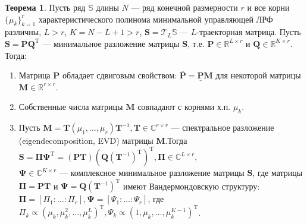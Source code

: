 \documentclass[specialist, substylefile = spbureport.rtx, subf,href,colorlinks=true, 12pt]{disser}
\theoremstyle{definition}
\newtheorem{theorem}{Теорема}
\DeclareMathOperator{\diag}{diag}
\begin{document}
\begin{theorem}
Пусть ряд $\mathbb{S}$ длины $N$ — ряд конечной размерности $r$ и все
корни $\{ \mu_k\}_{k=1}^r$ характеристического полинома минимальной управляющей ЛРФ различны, $L > r$, $K = N - L + 1 > r$, $\mathbf{S} = \mathcal{T}_L\mathbb{S}$ — $L$-траекторная матрица. Пусть $\mathbf{S} = \mathbf{PQ}^{\mathrm{T}}$ — минимальное разложение матрицы $\mathbf{S}$, т.е. $\mathbf{P} \in \mathbb{R}^{L \times r}$ и $\mathbf{Q} \in \mathbb{R}^{K \times r}$. \\
    \hspace*{0.5cm} Тогда:
    \begin{enumerate}
        \item Матрица $\mathbf{P}$ обладает сдвиговым свойством: $\overline{\mathbf{P}} = \underline{\mathbf{P}}\mathbf{M}$ для некоторой матрицы $\mathbf{M} \in \mathbb{R}^{r \times r}$.
        \item Собственные числа матрицы $\mathbf{M}$ совпадают с корнями х.п. $\mu_k$.
        \item Пусть $\mathbf{M} = \mathbf{T}$\diag $(\mu_1,\dots,\mu_r)\mathbf{T}^{-1}, \mathbf{T} \in \mathbb{C}^{r \times r}$ --- спектральное разложение (eigen\-decomposition, EVD) матрицы $\mathbf{M}$.Тогда $\mathbf{S} = \mathbf{\Pi\Psi}^{\mathrm{T}} = (\mathbf{PT})(\mathbf{Q}(\mathbf{T}^{-1})^{\mathrm{T}})^{\mathrm{T}}, \mathbf{\Pi} \in \mathbb{C}^{L \times r}, $\\$\mathbf{\Psi} \in \mathbb{C}^{K \times r}$ --- комплексное минимальное разложение матрицы $\mathbf{S}$, где матрицы $\mathbf{\Pi} = \mathbf{PT}$ и $\mathbf{\Psi} = \mathbf{Q}(\mathbf{T}^{-1})^{\mathrm{T}}$ имеют Вандермондовскую структуру: $\mathbf{\Pi} = [\Pi_1: \ldots :\Pi_r], \mathbf{\Psi} = [\Psi_1: \ldots :\Psi_r]$, где $\Pi_k \propto(\mu_k,\mu_k^2, \dots, \mu_k^L)^{\mathrm{T}}, \Psi_k \propto(1,\mu_k, \dots, \mu_k^{K - 1})^{\mathrm{T}}$.
    \end{enumerate}

\end{theorem}
\end{document}
